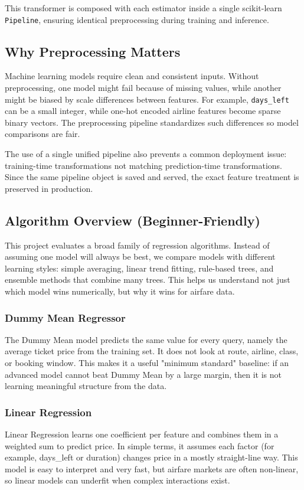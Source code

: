 \documentclass[conference]{IEEEtran}
\begin{document}
This transformer is composed with each estimator inside a single scikit-learn \texttt{Pipeline}, ensuring identical preprocessing during training and inference.

\subsection{Why Preprocessing Matters}
Machine learning models require clean and consistent inputs. Without preprocessing, one model might fail because of missing values, while another might be biased by scale differences between features. For example, \texttt{days\_left} can be a small integer, while one-hot encoded airline features become sparse binary vectors. The preprocessing pipeline standardizes such differences so model comparisons are fair.

The use of a single unified pipeline also prevents a common deployment issue: training-time transformations not matching prediction-time transformations. Since the same pipeline object is saved and served, the exact feature treatment is preserved in production.

\subsection{Algorithm Overview (Beginner-Friendly)}
This project evaluates a broad family of regression algorithms. Instead of assuming one model will always be best, we compare models with different learning styles: simple averaging, linear trend fitting, rule-based trees, and ensemble methods that combine many trees. This helps us understand not just which model wins numerically, but why it wins for airfare data.

\subsubsection{Dummy Mean Regressor}
The Dummy Mean model predicts the same value for every query, namely the average ticket price from the training set. It does not look at route, airline, class, or booking window. This makes it a useful "minimum standard" baseline: if an advanced model cannot beat Dummy Mean by a large margin, then it is not learning meaningful structure from the data.

\subsubsection{Linear Regression}
Linear Regression learns one coefficient per feature and combines them in a weighted sum to predict price. In simple terms, it assumes each factor (for example, days\_left or duration) changes price in a mostly straight-line way. This model is easy to interpret and very fast, but airfare markets are often non-linear, so linear models can underfit when complex interactions exist.
\end{document}
